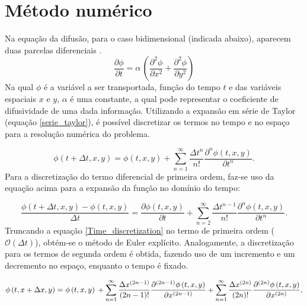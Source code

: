 \documentclass[10pt,twoside,a4paper]{article}
\begin{document}
	\section{Método numérico} %
	
	Na equação da difusão, para o caso bidimensional (indicada abaixo), aparecem duas parcelas diferenciais \cite{Leveque_parabolic}. 
	\begin{equation} \label{difusao_pura}
	\frac{\partial \phi}{\partial t} = \alpha \,\left( \frac{\partial^{2} \phi}{\partial x^{2}} + \frac{\partial^{2} \phi}{\partial y^{2}} \right) 
	\end{equation}
	Na qual $\phi$ é a variável a ser transportada, função do tempo $t$ e das variáveis espaciais $x$ e $y$, $\alpha$ é uma constante, a qual pode representar o coeficiente de difusividade de uma dada informação.
	Utilizando a expansão em série de Taylor (equação \ref{serie_taylor}), é possível discretizar os termos no tempo e no espaço para a resolução numérica do problema. 
	
	\begin{equation} \label{serie_taylor}
	\phi \left(t+\Delta t, x, y \right)= \phi \left(t, x, y\right) + \sum\limits_{n=1}^{\infty} \frac{\Delta t^{n}}{n!} \frac{\partial^{n} \phi \left(t, x, y\right)}{\partial t^{n}}.
	\end{equation}
	Para a discretização do termo diferencial de primeira ordem, faz-se uso da equação acima para a expansão da função no domínio do tempo:
	
	\begin{equation} \label{Time_discretization}
	\frac{\phi \left(t+\Delta t, x, y \right)-\phi \left(t, x, y\right)}{\Delta t}= \frac{\partial \phi \left(t, x, y\right)}{\partial t} + \sum\limits_{n=2}^{\infty} \frac{\Delta t^{n-1}}{n!} \frac{\partial^{n} \phi\left(t, x, y\right)}{\partial t^{n}}.
	\end{equation}
	Truncando a equação \ref{Time_discretization} no termo de primeira ordem ($\mathcal{O}(\Delta t)$), obtém-se o método de Euler explícito.
	Analogamente, a discretização para os termos de segunda ordem é obtida, fazendo uso de um incremento e um decremento no espaço, enquanto o tempo é fixado.
	
	\begin{equation} \label{Spacial_discretization1}
	\phi \left(t, x+\Delta x, y\right)= \phi \left(t, x, y\right) \\
	+\sum\limits_{n=1}^{\infty} \frac{\Delta x^{\left(2n-1\right)}}{\left(2n-1\right)!} \frac{\partial^{\left(2n-1\right)} \phi \left(t, x, y\right)}{\partial x^{\left(2n-1\right)}}\\
	+\sum\limits_{n=1}^{\infty} \frac{\Delta x^{\left(2n\right)}}{\left(2n\right)!} \frac{\partial^{\left(2n\right)} \phi \left(t, x, y\right)}{\partial x^{\left(2n\right)}},
	\end{equation}
	
\end{document}
